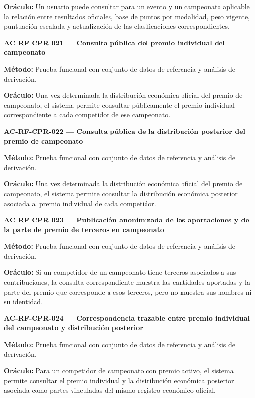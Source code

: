 \documentclass[10pt,letterpaper]{article}
\begin{document}
\textbf{Oráculo:} Un usuario puede consultar para un evento y un campeonato aplicable la relación entre resultados oficiales, base de puntos por modalidad, peso vigente, puntuación escalada y actualización de las clasificaciones correspondientes.\par\vspace{0.45em}
\noindent\textbf{AC-RF-CPR-021 --- Consulta pública del premio individual del campeonato}\par
\textbf{Método:} Prueba funcional con conjunto de datos de referencia y análisis de derivación.\par
\textbf{Oráculo:} Una vez determinada la distribución económica oficial del premio de campeonato, el sistema permite consultar públicamente el premio individual correspondiente a cada competidor de ese campeonato.\par\vspace{0.45em}
\noindent\textbf{AC-RF-CPR-022 --- Consulta pública de la distribución posterior del premio de campeonato}\par
\textbf{Método:} Prueba funcional con conjunto de datos de referencia y análisis de derivación.\par
\textbf{Oráculo:} Una vez determinada la distribución económica oficial del premio de campeonato, el sistema permite consultar la distribución económica posterior asociada al premio individual de cada competidor.\par\vspace{0.45em}
\noindent\textbf{AC-RF-CPR-023 --- Publicación anonimizada de las aportaciones y de la parte de premio de terceros en campeonato}\par
\textbf{Método:} Prueba funcional con conjunto de datos de referencia y análisis de derivación.\par
\textbf{Oráculo:} Si un competidor de un campeonato tiene terceros asociados a sus contribuciones, la consulta correspondiente muestra las cantidades aportadas y la parte del premio que corresponde a esos terceros, pero no muestra sus nombres ni su identidad.\par\vspace{0.45em}
\noindent\textbf{AC-RF-CPR-024 --- Correspondencia trazable entre premio individual del campeonato y distribución posterior}\par
\textbf{Método:} Prueba funcional con conjunto de datos de referencia y análisis de derivación.\par
\textbf{Oráculo:} Para un competidor de campeonato con premio activo, el sistema permite consultar el premio individual y la distribución económica posterior asociada como partes vinculadas del mismo registro económico oficial.\par\vspace{0.45em}
\end{document}
